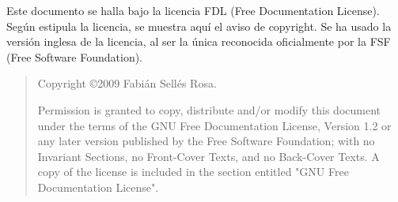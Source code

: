 \bigskip
\bigskip
\bigskip
\bigskip

\newpage{}

Este documento se halla bajo la licencia FDL (Free Documentation License). Según estipula la
licencia, se muestra aquí el aviso de copyright. Se ha usado la
versión inglesa de la licencia, al ser la única reconocida
oficialmente por la \href{http://www.fsf.org/}{}FSF (Free Software Foundation).

\begin{quote}
  Copyright \copyright  2009  Fabián Sellés Rosa.
  
  Permission is granted to copy, distribute and/or modify this document
  under the terms of the GNU Free Documentation License, Version 1.2
  or any later version published by the Free Software Foundation;
  with no Invariant Sections, no Front-Cover Texts, and no Back-Cover Texts.
  A copy of the license is included in the section entitled "GNU
  Free Documentation License".
\end{quote}
\newpage{}
